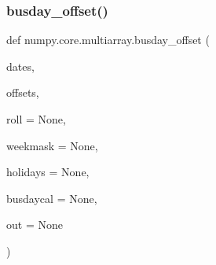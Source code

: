 \subsubsection{\texorpdfstring{busday\+\_\+offset()}{busday\_offset()}}
{\footnotesize\ttfamily def numpy.\+core.\+multiarray.\+busday\+\_\+offset (\begin{DoxyParamCaption}\item[{}]{dates,  }\item[{}]{offsets,  }\item[{}]{roll = {\ttfamily None},  }\item[{}]{weekmask = {\ttfamily None},  }\item[{}]{holidays = {\ttfamily None},  }\item[{}]{busdaycal = {\ttfamily None},  }\item[{}]{out = {\ttfamily None} }\end{DoxyParamCaption})}

